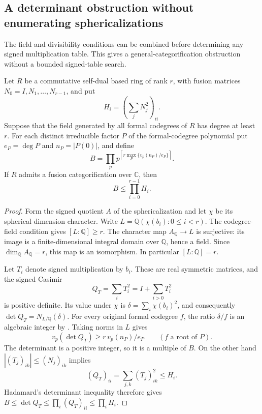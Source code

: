 \subsection{A determinant obstruction without enumerating sphericalizations}
\label{sec:signed-determinant}
The field and divisibility conditions can be combined before determining any
signed multiplication table. This gives a general-categorification obstruction without a bounded signed-table search.

\begin{proposition}\label{prop:signed-determinant}
Let $R$ be a commutative self-dual based ring of rank $r$, with fusion
matrices $N_0=I,N_1,\ldots,N_{r-1}$, and put
\[
 H_i=\left(\sum_jN_j^2\right)_{ii}.
\]
Suppose that the field generated by all formal codegrees of $R$ has
degree at least $r$. For each distinct irreducible factor $P$ of the formal-codegree
polynomial put $e_P=\deg P$ and $n_P=|P(0)|$, and define
\[
 B=\prod_p p^{\left\lceil r\max_P
          \{v_p(n_P)/e_P\}\right\rceil}.
\]
If $R$ admits a fusion categorification over $\mathbb C$, then
\[
 B\leq\prod_{i=0}^{r-1}H_i.
\]
\end{proposition}
\begin{proof}
Form the signed quotient $A$ of the sphericalization and let $\chi$ be its
spherical dimension character. Write $L=\mathbb Q(\chi(b_i):0\leq i<r)$.
The codegree-field condition gives $[L:\mathbb Q]\geq r$. The character
map $A_{\mathbb Q}\to L$ is surjective: its image is a finite-dimensional
integral domain over $\mathbb Q$, hence a field. Since
$\dim_{\mathbb Q}A_{\mathbb Q}=r$, this map is an isomorphism.
In particular $[L:\mathbb Q]=r$.

Let $T_i$ denote signed multiplication by $b_i$. These are real symmetric
matrices, and the signed Casimir
\[
 Q_T=\sum_iT_i^2=I+\sum_{i>0}T_i^2
\]
is positive definite. Its value under $\chi$ is
$\delta=\sum_i\chi(b_i)^2$, and consequently
$\det Q_T=N_{L/\mathbb Q}(\delta)$.
For every original formal codegree $f$, the ratio $\delta/f$ is an
algebraic integer by \cite[Proposition~\ref{B-prop:signed}]{Finite}. Taking norms in $L$ gives
\[
 v_p(\det Q_T)\geq r\,v_p(n_P)/e_P
 \qquad(f\text{ a root of }P).
\]
The determinant is a positive integer, so it is a multiple of $B$.
On the other hand $|(T_j)_{ik}|\leq(N_j)_{ik}$ implies
\[
 (Q_T)_{ii}=\sum_{j,k}(T_j)_{ik}^2\leq H_i.
\]
Hadamard's determinant inequality therefore gives
$B\leq\det Q_T\leq\prod_i(Q_T)_{ii}\leq\prod_iH_i$.
\end{proof}

